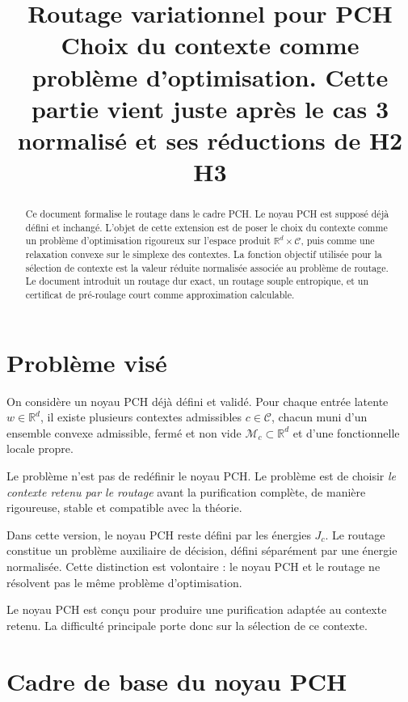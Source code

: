 \documentclass[11pt,a4paper]{article}
\title{Routage variationnel pour PCH\\
\large Choix du contexte comme problème d'optimisation. Cette partie vient juste après le cas 3 normalisé et ses réductions de H2 H3}
\author{}
\date{}
\newcommand{\R}{\mathbb R}
\newcommand{\Mcal}{\mathcal M}
\newcommand{\Ccal}{\mathcal C}
\begin{document}
\maketitle

\begin{abstract}
Ce document formalise le routage dans le cadre PCH. Le noyau PCH est supposé déjà défini et inchangé. L'objet de cette extension est de poser le choix du contexte comme un problème d'optimisation rigoureux sur l'espace produit \(\R^d\times\Ccal\), puis comme une relaxation convexe sur le simplexe des contextes. La fonction objectif utilisée pour la sélection de contexte est la valeur réduite normalisée associée au problème de routage. Le document introduit un routage dur exact, un routage souple entropique, et un certificat de pré-roulage court comme approximation calculable.
\end{abstract}

\tableofcontents

\section{Problème visé}

On considère un noyau PCH déjà défini et validé. Pour chaque entrée latente \(w\in\R^d\), il existe plusieurs contextes admissibles \(c\in\Ccal\), chacun muni d'un ensemble convexe admissible, fermé et non vide \(\Mcal_c\subset\R^d\) et d'une fonctionnelle locale propre.

Le problème n'est pas de redéfinir le noyau PCH. Le problème est de choisir \emph{le contexte retenu par le routage} avant la purification complète, de manière rigoureuse, stable et compatible avec la théorie.

Dans cette version, le noyau PCH reste défini par les énergies \(J_c\). Le routage constitue un problème auxiliaire de décision, défini séparément par une énergie normalisée. Cette distinction est volontaire : le noyau PCH et le routage ne résolvent pas le même problème d'optimisation.

Le noyau PCH est conçu pour produire une purification adaptée au contexte retenu. La difficulté principale porte donc sur la sélection de ce contexte.

\section{Cadre de base du noyau PCH}
\end{document}
